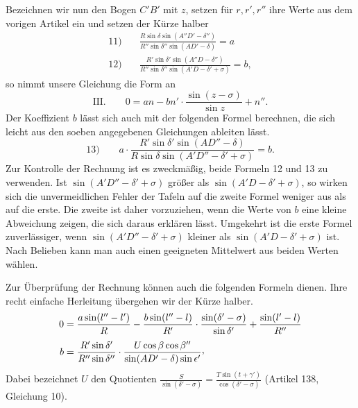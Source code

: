 Bezeichnen wir nun den Bogen $C'B'$ mit $z$, setzen für $r,r',r''$ ihre Werte aus dem vorigen Artikel ein und setzen der Kürze halber
\[
\begin{aligned}
11)\quad&\frac{R\sin\delta\sin(A''D'-\delta'')}{R''\sin\delta''\sin(AD'-\delta)}=a\\[.8ex]
12)\quad&\frac{R'\sin\delta'\sin(A''D-\delta'')}{R''\sin\delta''\sin(A'D-\delta'+\sigma)}=b,
\end{aligned}
\]
so nimmt unsere Gleichung die Form an
\[
\text{III.}\qquad 0=an-bn'\cdot\frac{\sin(z-\sigma)}{\sin z}+n''.
\]
Der Koeffizient $b$ lässt sich auch mit der folgenden Formel berechnen, die sich leicht aus den soeben angegebenen Gleichungen ableiten lässt.
\[
13)\qquad a\cdot\frac{R'\sin\delta'\sin(AD''-\delta)}{R\sin\delta\sin(A'D''-\delta'+\sigma)}=b.
\]
Zur Kontrolle der Rechnung ist es zweckmäßig, beide Formeln 12 und 13 zu verwenden.
\hypertarget{native-189}{}Ist $\sin(A'D''-\delta'+\sigma)$ größer als $\sin(A'D-\delta'+\sigma)$, so wirken sich die unvermeidlichen Fehler der Tafeln auf die zweite Formel weniger aus als auf die erste. Die zweite ist daher vorzuziehen, wenn die Werte von $b$ eine kleine Abweichung zeigen, die sich daraus erklären lässt. Umgekehrt ist die erste Formel zuverlässiger, wenn $\sin(A'D''-\delta'+\sigma)$ kleiner als $\sin(A'D-\delta'+\sigma)$ ist. Nach Belieben kann man auch einen geeigneten Mittelwert aus beiden Werten wählen.

Zur Überprüfung der Rechnung können auch die folgenden Formeln dienen. Ihre recht einfache Herleitung übergehen wir der Kürze halber.
\[
\begin{aligned}
0&=\frac{a\sin(l''-l')}{R}-\frac{b\sin(l''-l)}{R'}\cdot\frac{\sin(\delta'-\sigma)}{\sin\delta'}+\frac{\sin(l'-l)}{R''}\\[.8ex]
b&=\frac{R'\sin\delta'}{R''\sin\delta''}\cdot\frac{U\cos\beta\cos\beta''}{\sin(AD'-\delta)\sin\epsilon'}\mathpunct{\raisebox{.45ex}{,}}
\end{aligned}
\]
Dabei bezeichnet $U$ den Quotienten $\frac{S}{\sin(\delta'-\sigma)}=\frac{T\sin(t+\gamma')}{\cos(\delta'-\sigma)}$ (Artikel 138, Gleichung 10).
